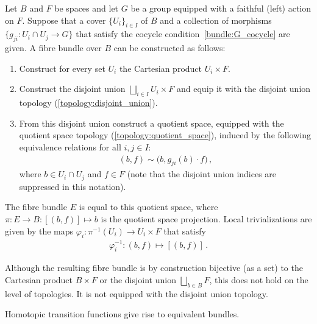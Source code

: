     \begin{construct}\label{bundle:fibre_bundle_construction_theorem}
        Let $B$ and $F$ be spaces and let $G$ be a group equipped with a faithful (left) action on $F$. Suppose that a cover $\{U_i\}_{i\in I}$ of $B$ and a collection of morphisms $\{g_{ji}:U_i\cap U_j\rightarrow G\}$ that satisfy the cocycle condition~\eqref{bundle:G_cocycle} are given. A fibre bundle over $B$ can be constructed as follows:
        \begin{enumerate}
            \item Construct for every set $U_i$ the Cartesian product $U_i\times F$.
            \item Construct the disjoint union $\bigsqcup_{i\in I}U_i\times F$ and equip it with the disjoint union topology (\cref{topology:disjoint_union}).
            \item From this disjoint union construct a quotient space, equipped with the quotient space topology (\cref{topology:quotient_space}), induced by the following equivalence relations for all $i,j\in I$:
                \begin{gather}
                    (b,f)\sim\bigl(b,g_{ji}(b)\cdot f\bigr)\,,
                \end{gather}
                where $b\in U_i\cap U_j$ and $f\in F$ (note that the disjoint union indices are suppressed in this notation).
        \end{enumerate}
        The fibre bundle $E$ is equal to this quotient space, where $\pi:E\rightarrow B:[(b,f)]\mapsto b$ is the quotient space projection. Local trivializations are given by the maps $\varphi_i:\pi^{-1}(U_i)\rightarrow U_i\times F$ that satisfy
        \begin{gather}
            \varphi_i^{-1}:(b,f)\mapsto[(b,f)]\,.
        \end{gather}
    \end{construct}
    \begin{remark}[Topology]
        Although the resulting fibre bundle is by construction bijective (as a set) to the Cartesian product $B\times F$ or the disjoint union $\bigsqcup_{b\in B}F$, this does not hold on the level of topologies. It is not equipped with the disjoint union topology.
    \end{remark}

    \begin{property}
        Homotopic transition functions give rise to equivalent bundles.
    \end{property}


